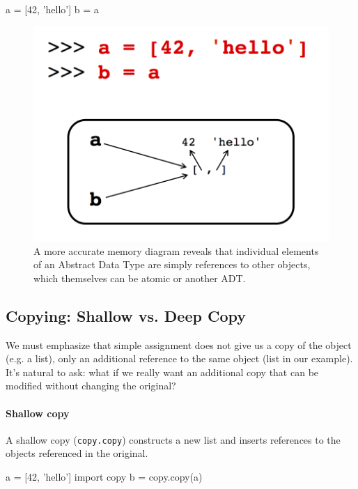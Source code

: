 \documentclass[12pt,letterpaper,twoside]{article}
\begin{document}
\begin{enumerate}
\vspace{-3ex}
\begin{python}
a = [42, 'hello']
b = a
\end{python}
\vspace{-2ex}
\begin{figure}[h]
\centering
\includegraphics[scale=0.35]{fig/list-ref.png}
\caption{\small A more accurate memory diagram reveals that individual elements of an Abstract Data Type are simply
references to other objects, which themselves can be atomic or another ADT.}
\end{figure}

\vspace{-3ex}
\subsection{Copying: Shallow vs. Deep Copy}
We must emphasize that simple assignment does not give us a copy of the object (e.g. a list), only an
additional reference to the same object (list in our example). It's natural to ask: 
what if we really want an additional copy that can be modified without
changing the original?

\paragraph{Shallow copy}
A shallow copy (\texttt{copy.copy}) constructs a new list and inserts
references to the objects referenced in the original.

\begin{python}
a = [42, 'hello']
import copy
b = copy.copy(a)
\end{python}


\end{enumerate}
\end{document}
